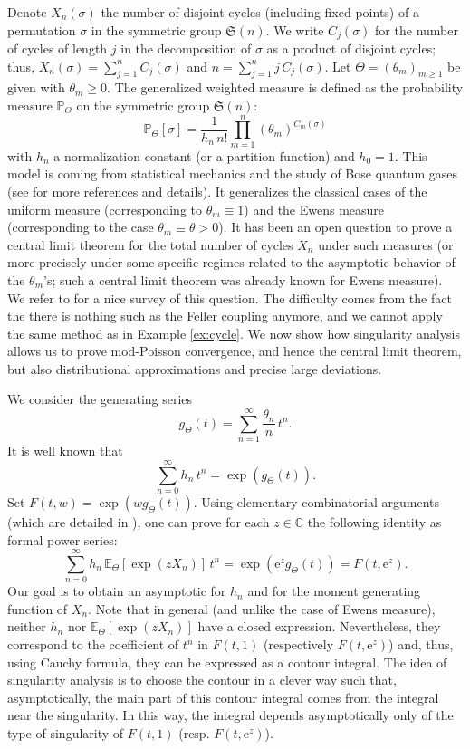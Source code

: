 \documentclass[12pt,a4paper,reqno]{amsart}
\theoremstyle{remark}
\newcommand{\E}{\mathrm{e}}
\begin{document}
Denote $X_{n}(\sigma)$ the number of disjoint cycles (including fixed points) of a permutation $\sigma$  in the symmetric group $\mathfrak{S}(n)$. We write $C_j(\sigma)$ for the number of cycles of length $j$ in the decomposition of $\sigma$ as a product of disjoint cycles; thus, $X_{n}(\sigma) =\sum_{j=1}^n C_j(\sigma)$ and $n = \sum_{j=1}^n j\,C_j(\sigma)$. Let $\Theta=(\theta_m)_{m\geq1}$ be given with $\theta_m\geq 0$. The generalized weighted measure is defined as the probability measure $\mathbb{P}_{\Theta} $ on the symmetric group $\mathfrak{S}(n)$:
$$\mathbb P_{\Theta}[\sigma]=\dfrac{1}{h_n\, n!}\prod_{m=1}^n (\theta_m)^{C_m(\sigma)}$$ with $h_n$ a normalization constant (or a partition function) and $h_0=1$. This model  is coming from statistical mechanics and the study of Bose quantum gases (see \cite{NZ13} for more references and details). It generalizes the classical cases of the uniform measure (corresponding to $\theta_m\equiv 1$) and the Ewens measure (corresponding to the case $\theta_m\equiv\theta>0$). It has been an open question to prove a central limit theorem for the total number of cycles $X_n$ under such measures (or more precisely under some specific regimes related to the asymptotic behavior of the $\theta_m$'s; such a central limit theorem was already known for Ewens measure). We refer to \cite{EU14} for a nice survey of this question. The difficulty comes from the fact the there is nothing such as the Feller coupling anymore, and we cannot apply the same method as in Example \ref{ex:cycle}. We now show how singularity analysis allows us to prove mod-Poisson convergence, and hence the central limit theorem, but also distributional approximations and precise large deviations.
\medskip

We consider the generating series 
$$g_\Theta(t)=\sum_{n=1}^\infty \dfrac{\theta_n}{n} \,t^n.$$ 
It is well known that 
\begin{equation}\label{eq:gf_hn}
\sum_{n=0}^\infty h_n \,t^n=\exp(g_\Theta(t)).
\end{equation}
Set $F(t,w)=\exp(w g_\Theta(t))$. Using elementary combinatorial arguments (which are detailed in \cite{NZ13}),
one can prove for each $z\in\mathbb{C}$ the following identity as formal power series:
\begin{equation}\label{eq:combtheta}
\sum_{n=0}^\infty h_n \,\mathbb E_{\Theta} [\exp(z X_n)]\,t^n=\exp(\E^z g_\Theta(t))=F(t,\E^z).
\end{equation}
Our goal is to obtain an asymptotic for $h_n$ and for the moment generating function of $X_n$. Note that in general (and unlike the case of Ewens measure), neither $h_n$ nor $\mathbb E_{\Theta} [\exp(z X_n)]$ have a closed expression.
Nevertheless, they correspond to the coefficient of $t^n$ in $F(t,1)$ (respectively $F(t,\E^z)$) and, thus, using Cauchy formula, they can be expressed as a contour integral. The idea of singularity analysis is to choose the contour in a clever way such that, asymptotically, the main part of this contour integral comes from the integral near the singularity. In this way, the integral depends asymptotically only of the type of singularity of $F(t,1)$ (resp. $F(t,\E^z)$).\bigskip
\end{document}
